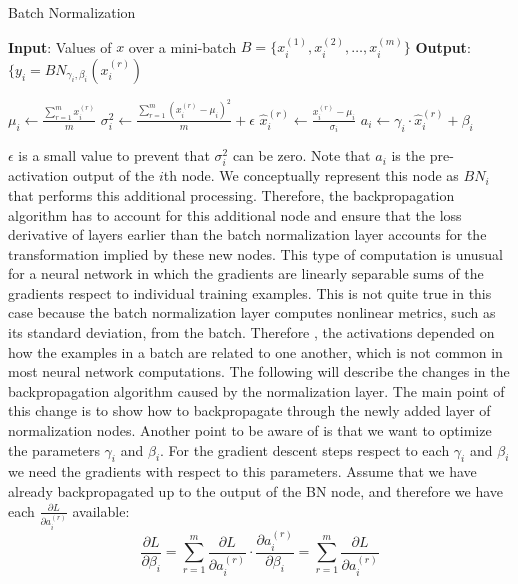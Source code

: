 \documentclass[11pt]{article}
\begin{document}
\begin{algorithm}
\caption{Batch Normalization}
\begin{algorithmic}[1]

    \State \textbf{Input}: Values of $x$ over a mini-batch $B = \{x_{i}^{(1)}, x_{i}^{(2)}, \dots, x_{i}^{(m)}\}$
    \State \textbf{Output}: $\{y_i = BN_{\gamma_i,\beta_i}(x_{i}^{(r)})$

    \State $\mu_i \leftarrow \frac{\sum_{r=1}^{m} x_{i}^{(r)}}{m}$ 
    \State $\sigma_i^2 \leftarrow \frac{\sum_{r=1}^{m}(x_{i}^{(r)} - \mu_i)^2}{m} + \epsilon$
    \State $\hat{x}_i^{(r)} \leftarrow \frac{ x_{i}^{(r)} - \mu_i }{\sigma_i}$
    \State $a_i \leftarrow \gamma_i \cdot \hat{x}_i^{(r)} + \beta_i $
\end{algorithmic}
\end{algorithm}
$\epsilon$ is a small value to prevent that $\sigma_i^2$ can be zero. Note that $a_i$ is the pre-activation output of the $i$th node. We conceptually represent this node as $BN_i$ that performs this additional processing. Therefore, the backpropagation algorithm has to account for this additional node and ensure that the loss derivative of layers earlier than the batch normalization layer accounts for the transformation implied by these new nodes. This type of computation is unusual for a neural network in which the gradients are linearly separable sums of the gradients respect to individual training examples. This is not quite true in this case because the batch normalization layer computes nonlinear metrics, such as its standard deviation, from the batch. Therefore , the activations depended on how the examples in a batch are related to one another, which is not common in most neural network computations. The following will describe the changes in the backpropagation algorithm caused by the normalization layer. The main point of this change is to show how to backpropagate through the newly added layer of normalization nodes. Another point to be aware of is that we want to optimize the parameters $\gamma_i$ and $\beta_i$. For the gradient descent steps respect to each $\gamma_i$ and $\beta_i$ we need the gradients with respect to this parameters. Assume that we have already backpropagated up to the output of the BN node, and therefore we have each $\frac{\partial L}{\partial a_i^{(r)}}$ available:
$$\frac{\partial L}{\partial \beta_i} = \sum_{r=1}^{m}\frac{\partial L}{\partial a_i^{(r)}} \cdot \frac{\partial a_i^{(r)}}{\partial \beta_i} = \sum_{r=1}^{m}\frac{\partial L}{\partial a_i^{(r)}}$$
\end{document}
